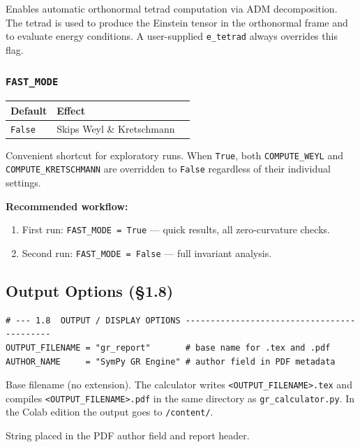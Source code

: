 \documentclass[11pt,a4paper]{article}
\newcommand{\code}[1]{\texttt{\small#1}}
\begin{document}
Enables automatic orthonormal tetrad computation via ADM decomposition.
The tetrad is used to produce the Einstein tensor in the orthonormal frame
and to evaluate energy conditions.  A user-supplied \code{e\_tetrad} always
overrides this flag.

\subsubsection{\code{FAST\_MODE}}

\begin{center}
\begin{tabular}{lll}
  \toprule
  Default & Effect & \\
  \midrule
  \code{False} & Skips Weyl \& Kretschmann & \\
  \bottomrule
\end{tabular}
\end{center}

Convenient shortcut for exploratory runs.  When \code{True}, both
\code{COMPUTE\_WEYL} and \code{COMPUTE\_KRETSCHMANN} are overridden to
\code{False} regardless of their individual settings.

\begin{tipbox}
  \textbf{Recommended workflow:}
  \begin{enumerate}
    \item First run: \code{FAST\_MODE = True} — quick results,
          all zero-curvature checks.
    \item Second run: \code{FAST\_MODE = False} — full invariant analysis.
  \end{enumerate}
\end{tipbox}

\subsection{Output Options (\S1.8)}
\label{sec:cfg-output}

\begin{lstlisting}
# --- 1.8  OUTPUT / DISPLAY OPTIONS -------------------------------------------
OUTPUT_FILENAME = "gr_report"       # base name for .tex and .pdf
AUTHOR_NAME     = "SymPy GR Engine" # author field in PDF metadata
\end{lstlisting}

\begin{description}[leftmargin=2.5cm,style=nextline]
  \item[\code{OUTPUT\_FILENAME}]
    Base filename (no extension).  The calculator writes
    \code{<OUTPUT\_FILENAME>.tex} and compiles
    \code{<OUTPUT\_FILENAME>.pdf} in the same directory as
    \code{gr\_calculator.py}.  In the Colab edition the output goes to
    \code{/content/}.

  \item[\code{AUTHOR\_NAME}]
    String placed in the PDF author field and report header.
\end{description}
\end{document}
